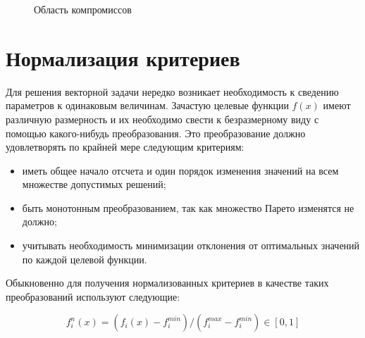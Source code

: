 \documentclass[a4paper,14pt]{report}
\begin{document}
\begin{figure}[H]
 \caption{Область компромиссов}
 \label{fig:comp}
\end{figure}

\section{Нормализация критериев}
Для решения векторной задачи нередко возникает необходимость к сведению параметров к одинаковым величинам.
Зачастую целевые функции $f(x)$ имеют различную размерность и их необходимо свести к безразмерному виду с помощью какого-нибудь преобразования. Это преобразование должно удовлетворять по крайней мере следующим критериям:
\begin{itemize}
\item иметь общее начало отсчета и один порядок изменения значений на всем множестве допустимых решений;

\item быть монотонным преобразованием, так как множество Парето изменятся не должно;

\item учитывать необходимость минимизации отклонения от оптимальных значений по каждой целевой функции.
\end{itemize}

Обыкновенно для получения нормализованных критериев в качестве таких преобразований используют следующие:

\begin{equation}
f^{n}_i(x) = (f_i(x) - f^{min}_i)/(f^{max}_i - f^{min}_i) \in [0, 1]
\label{ref:lim}
\end{equation}
\end{document}
